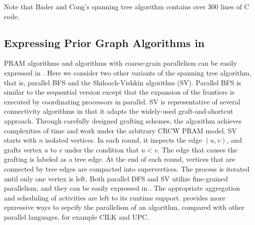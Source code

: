 {%

Note that Bader and Cong's spanning tree algorithm contains over 300 lines of C code.

\subsection{Expressing Prior Graph Algorithms in \Xten{}}

PRAM algorithms and algorithms with coarse-grain parallelism can be easily expressed in \Xten{}. Here we consider two other variants of the spanning tree algorithm, that is, parallel BFS and the Shiloach-Vishkin algorithm (SV).  Parallel BFS is similar to the sequential version except that the expansion of the frontiers is executed by coordinating processors in parallel. SV is representative of several connectivity algorithms in that it adapts the widely-used
graft-and-shortcut approach. Through carefully designed grafting
schemes, the algorithm achieves complexities of  time and
 work under the arbitrary CRCW PRAM model. SV starts with $n$ isolated vertices. In each round, it inspects the edge $(u,v)$, and grafts vertex $u$ to $v$ under the condition that $u<v$. The edge that causes the grafting is labeled as a tree edge. At the end of each round, vertices that are connected by tree edges are compacted into supervertices. The process is iterated until only one vertex is left. Both parallel DFS and SV utilize fine-grained parallelism, and they can be easily expressed in \Xten{}. The appropriate aggregation and scheduling of activities are left to its runtime support. \Xten{} provides more epxressive ways to sepcify the parallelism of an algorithm, compared with other parallel languages, for example CILK and UPC.



}
